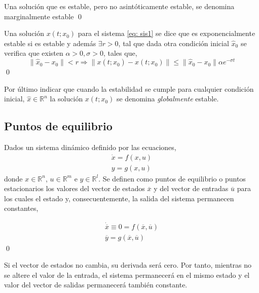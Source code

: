 \begin{definition}
Una solución que es estable, pero no asintóticamente estable, se denomina marginalmente estable
\qed
\end{definition}

\begin{definition}
Una solución $x(t;x_0)$ para el sistema \ref{eq: sis1} se dice que es exponencialmente estable si es estable y además  $\exists r>0$, tal que dada otra condición inicial $\hat x_0$ se verifica que existen $\alpha>0 , \sigma >0$, tales que,
\begin{equation}
\|\hat x_0-x_0\|<r \Rightarrow \|x(t;\hat x_0) - x(t;x_0)\| \leq \|\hat x_0 - x_0\| \alpha e^{-\sigma t}
\end{equation}
\qed
\end{definition}

Por último indicar que cuando la estabilidad se cumple para cualquier condición inicial, $\hat x  \in \mathbb{R}^n$ la solución $x(t;x_0)$ se denomina \emph{globalmente} estable.


\subsection{Puntos de equilibrio} 
\begin{definition} Dados un sistema dinámico definido por las ecuaciones,
\begin{align}
\dot{x} = f(x,u)\\
y = g(x,u)
\end{align}
donde $x \in \mathbb{R}^n$, $u \in \mathbb{R}^m$ e $y \in \mathbb{R}^l$. Se definen como puntos de equilibrio o puntos estacionarios los valores del vector de estados $\overline x$ y del vector de entradas $\overline u$ para los cuales el estado y, consecuentemente, la salida del sistema permanecen constantes,

\begin{align}
\dot{\overline x} \equiv 0 = f(\overline x, \overline u)\\
\overline y = g(\overline x,\overline u)
\end{align}
\qed
\end{definition}

Si el vector de estados no cambia, su derivada será cero. Por tanto, mientras no se altere el valor de la entrada, el sistema permanecerá en el mismo estado y el valor del vector de salidas permanecerá también constante. 

